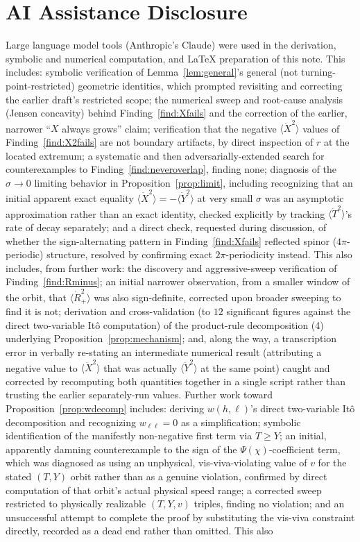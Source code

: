 \documentclass[12pt]{amsart}
\theoremstyle{plain}
\theoremstyle{remark}
\begin{document}
\section*{AI Assistance Disclosure}

Large language model tools (Anthropic's Claude) were used in the derivation, symbolic and numerical computation, and \LaTeX{} preparation of this note. This includes: symbolic verification of Lemma~\ref{lem:general}'s general (not turning-point-restricted) geometric identities, which prompted revisiting and correcting the earlier draft's restricted scope; the numerical sweep and root-cause analysis (Jensen concavity) behind Finding~\ref{find:Xfails} and the correction of the earlier, narrower ``$X$ always grows'' claim; verification that the negative $\langle\dot X^2\rangle$ values of Finding~\ref{find:X2fails} are not boundary artifacts, by direct inspection of $r$ at the located extremum; a systematic and then adversarially-extended search for counterexamples to Finding~\ref{find:neveroverlap}, finding none; diagnosis of the $\sigma\to0$ limiting behavior in Proposition~\ref{prop:limit}, including recognizing that an initial apparent exact equality $\langle\dot X^2\rangle=-\langle\dot Y^2\rangle$ at very small $\sigma$ was an asymptotic approximation rather than an exact identity, checked explicitly by tracking $\langle\dot T^2\rangle$'s rate of decay separately; and a direct check, requested during discussion, of whether the sign-alternating pattern in Finding~\ref{find:Xfails} reflected spinor ($4\pi$-periodic) structure, resolved by confirming exact $2\pi$-periodicity instead. This also includes, from further work: the discovery and aggressive-sweep verification of Finding~\ref{find:Rminus}; an initial narrower observation, from a smaller window of the orbit, that $\langle\dot R_+^2\rangle$ was also sign-definite, corrected upon broader sweeping to find it is not; derivation and cross-validation (to $12$ significant figures against the direct two-variable It\^o computation) of the product-rule decomposition (4) underlying Proposition~\ref{prop:mechanism}; and, along the way, a transcription error in verbally re-stating an intermediate numerical result (attributing a negative value to $\langle\dot X^2\rangle$ that was actually $\langle\dot Y^2\rangle$ at the same point) caught and corrected by recomputing both quantities together in a single script rather than trusting the earlier separately-run values. Further work toward Proposition~\ref{prop:wdecomp} includes: deriving $w(h,\ell)$'s direct two-variable It\^o decomposition and recognizing $w_{\ell\ell}=0$ as a simplification; symbolic identification of the manifestly non-negative first term via $T\geq Y$; an initial, apparently damning counterexample to the sign of the $\Psi(\chi)$-coefficient term, which was diagnosed as using an unphysical, vis-viva-violating value of $v$ for the stated $(T,Y)$ orbit rather than as a genuine violation, confirmed by direct computation of that orbit's actual physical speed range; a corrected sweep restricted to physically realizable $(T,Y,v)$ triples, finding no violation; and an unsuccessful attempt to complete the proof by substituting the vis-viva constraint directly, recorded as a dead end rather than omitted. This also 
\end{document}
